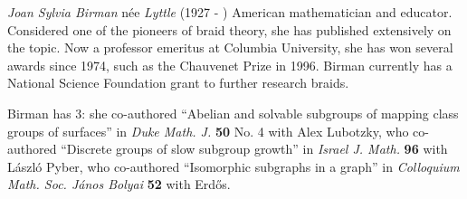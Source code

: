 \documentclass[12pt]{article}
\begin{document}
\emph{Joan Sylvia Birman} n\'ee \emph{Lyttle} (1927 - ) American mathematician and educator. Considered one of the pioneers of braid theory, she has published extensively on the topic. Now a professor emeritus at Columbia University, she has won several awards since 1974, such as the Chauvenet Prize in 1996. Birman currently has a National Science Foundation grant to further research braids.

Birman has  3: she co-authored ``Abelian and solvable subgroups of mapping class groups of surfaces'' in {\it Duke Math. J.} {\bf 50} No. 4 with Alex Lubotzky, who co-authored ``Discrete groups of slow subgroup growth'' in {\it Israel J. Math.} {\bf 96} with L\'aszl\'o Pyber, who co-authored ``Isomorphic subgraphs in a graph'' in {\it Colloquium Math. Soc. J\'anos Bolyai} {\bf 52} with Erd\H{o}s.
\end{document}
